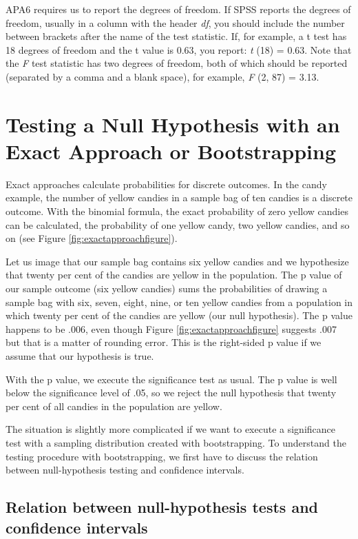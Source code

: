 \documentclass[a4paper]{book}
\theoremstyle{definition}
\theoremstyle{definition}
\theoremstyle{definition}
\theoremstyle{remark}
\begin{document}
APA6 requires us to report the degrees of freedom. If SPSS reports the
degrees of freedom, usually in a column with the header \emph{df}, you
should include the number between brackets after the name of the test
statistic. If, for example, a t test has 18 degrees of freedom and the t
value is 0.63, you report: \emph{t} (18) = 0.63. Note that the \emph{F}
test statistic has two degrees of freedom, both of which should be
reported (separated by a comma and a blank space), for example, \emph{F}
(2, 87) = 3.13.

\section{Testing a Null Hypothesis with an Exact Approach or
Bootstrapping}\label{testing-a-null-hypothesis-with-an-exact-approach-or-bootstrapping}

Exact approaches calculate probabilities for discrete outcomes. In the
candy example, the number of yellow candies in a sample bag of ten
candies is a discrete outcome. With the binomial formula, the exact
probability of zero yellow candies can be calculated, the probability of
one yellow candy, two yellow candies, and so on (see Figure
\ref{fig:exactapproachfigure}).

Let us image that our sample bag contains six yellow candies and we
hypothesize that twenty per cent of the candies are yellow in the
population. The p value of our sample outcome (six yellow candies) sums
the probabilities of drawing a sample bag with six, seven, eight, nine,
or ten yellow candies from a population in which twenty per cent of the
candies are yellow (our null hypothesis). The p value happens to be
.006, even though Figure \ref{fig:exactapproachfigure} suggests .007 but
that is a matter of rounding error. This is the right-sided p value if
we assume that our hypothesis is true.

With the p value, we execute the significance test as usual. The p value
is well below the significance level of .05, so we reject the null
hypothesis that twenty per cent of all candies in the population are
yellow.

The situation is slightly more complicated if we want to execute a
significance test with a sampling distribution created with
bootstrapping. To understand the testing procedure with bootstrapping,
we first have to discuss the relation between null-hypothesis testing
and confidence intervals.

\subsection{Relation between null-hypothesis tests and confidence
intervals}\label{null-ci0}
\end{document}
